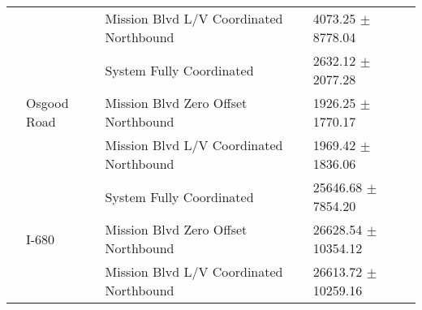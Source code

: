 \begin{tabular}{llll}
 &  & Mission Blvd L/V Coordinated Northbound & 4073.25 $\pm$ 8778.04 \\
 & \multirow[t]{3}{*}{Osgood Road} & System Fully Coordinated & 2632.12 $\pm$ 2077.28 \\
 &  & Mission Blvd Zero Offset Northbound & 1926.25 $\pm$ 1770.17 \\
 &  & Mission Blvd L/V Coordinated Northbound & 1969.42 $\pm$ 1836.06 \\
 & \multirow[t]{3}{*}{I-680} & System Fully Coordinated & 25646.68 $\pm$ 7854.20 \\
 &  & Mission Blvd Zero Offset Northbound & 26628.54 $\pm$ 10354.12 \\
 &  & Mission Blvd L/V Coordinated Northbound & 26613.72 $\pm$ 10259.16 \\
\bottomrule
\end{tabular}
